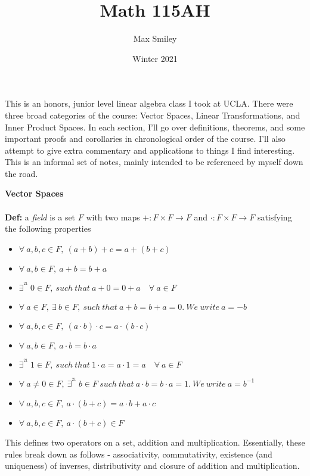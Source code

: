 \documentclass[12pt]{article}
\begin{document}
\title{Math 115AH}
\author{Max Smiley}
\date{Winter 2021}
\maketitle
This is an honors, junior level linear algebra class I took at UCLA. There were three broad categories of the course: Vector Spaces, Linear Transformations, and Inner Product Spaces. In each section, I'll go over definitions, theorems, and some important proofs and corollaries in chronological order of the course. I'll also attempt to give extra commentary and applications to things I find interesting. This is an informal set of notes, mainly intended to be referenced by myself down the road.
\clearpage

\textbf{\Large Vector Spaces}
\\\\
\textbf{Def: }a \emph{field} is a set $F$ with two maps $+: F \times F \rightarrow F$ and $\cdot: F \times F \rightarrow F$ satisfying the following properties\\

\begin{itemize}
\item $\forall\ a, b, c \in F,\ (a + b) + c = a + (b + c)$
\item $\forall\ a, b \in F,\ a + b = b + a$
\item $\exists ^^21 \ 0 \in F,\ such\ that\ a + 0 = 0 + a\quad \forall\ a \in F$
\item $\forall\ a \in F,\ \exists\ b \in F,\ such\ that\ a + b = b + a = 0.\ We\ write\ a = -b$
\item $\forall\ a,b,c \in F,\ (a \cdot b) \cdot c = a \cdot (b \cdot c)$
\item $\forall\ a,b \in F,\ a \cdot b = b \cdot a$
\item $\exists ^^21 \ 1 \in F,\ such\ that\ 1 \cdot a = a \cdot 1 = a \quad \forall\ a \in F$
\item $\forall\ a \neq 0\in F,\ \exists ^^21\ b\in F\ such\ that\ a \cdot b = b \cdot a = 1.\ We\ write\ a = b^{-1}$
\item $\forall\ a,b,c \in F,\ a \cdot (b + c) = a \cdot b + a \cdot c$
\item $\forall\ a,b,c \in F,\ a \cdot (b + c) \in F$
\end{itemize}

This defines two operators on a set, addition and multiplication. Essentially, these rules break down as follows - associativity, commutativity, existence (and uniqueness) of inverses, distributivity and closure of addition and multiplication.\\
\end{document}
